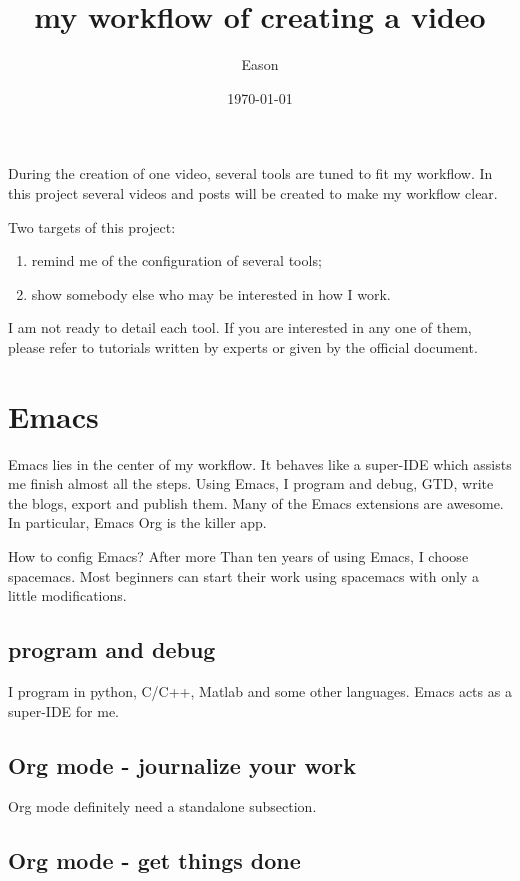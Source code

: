 \documentclass[koma,utopia,letterpaper,captions=tableheading,11pt,listings-sv,microtype,paralist,colorlinks=true,urlcolor=blue]{org-article}
\author{Eason}
\date{\today}
\title{my workflow of creating a video}
\begin{document}
\maketitle
\tableofcontents

During the creation of one video, several tools are tuned to fit my workflow. In
this project several videos and posts will be created to make my workflow clear.

Two targets of this project:
\begin{enumerate}
\item remind me of the configuration of several tools;
\item show somebody else who may be interested in how I work.
\end{enumerate}

I am not ready to detail each tool. If you are interested in any one of them,
please refer to tutorials written by experts or given by the official document.

\section{Emacs}
\label{sec:org232de87}


Emacs lies in the center of my workflow. It behaves like a super-IDE which
assists me finish almost all the steps. Using Emacs, I program and debug, GTD,
write the blogs, export and publish them. Many of the Emacs extensions are
awesome. In particular, Emacs Org is the killer app.

How to config Emacs? After more Than ten years of using Emacs, I choose
spacemacs. Most beginners can start their work using spacemacs with only a
little modifications.

\subsection{program and debug}
\label{sec:orgcb33eca}


I program in python, C/C++, Matlab and some other languages. Emacs acts as a
super-IDE for me.


\subsection{Org mode - journalize your work}
\label{sec:orga18221f}


Org mode definitely need a standalone subsection.

\subsection{Org mode - get things done}
\label{sec:org8f6b45e}
\end{document}
